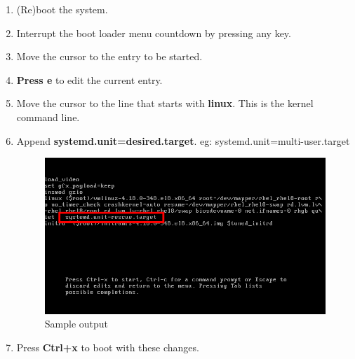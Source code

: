 \begin{flushleft}

	\bigskip
		\begin{enumerate}
			\item (Re)boot the system.
			\item Interrupt the boot loader menu countdown by pressing any key.
			\item Move the cursor to the entry to be started.
			\item \textbf{Press e} to edit the current entry.
			\item Move the cursor to the line that starts with \textbf{linux}. This is the kernel command line.
			\item Append \textbf{systemd.unit=desired.target}.
			\newline eg: systemd.unit=multi-user.target
			
			\begin{figure}[h!]
				\centering
				\includegraphics[scale=.5]{content/chapter1/images/rescue.png}
				\caption{Sample output}
				\label{fig:free_h_s_2}
			\end{figure}
			
			\item Press \textbf{Ctrl+x} to boot with these changes.
		\end{enumerate}
	
\end{flushleft}

\newpage